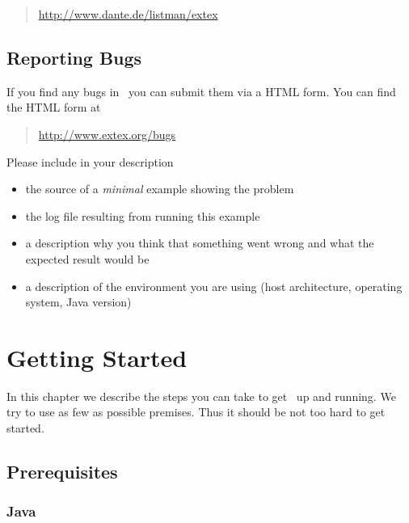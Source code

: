 \documentclass{extex-doc}
\begin{document}
\begin{quotation}
  \url{http://www.dante.de/listman/extex}
\end{quotation}


\section{Reporting Bugs}


If you find any bugs in \ExTeX\ you can submit them 
via a HTML form.
You can find the HTML form at
\begin{quotation}
  \url{http://www.extex.org/bugs}
\end{quotation}

Please include in your description 
\begin{itemize}
\item the source of a \emph{minimal} example showing the problem
\item the log file resulting from running this example
\item a description why you think that something went wrong and what
  the expected result would be
\item a description of the environment you are using (host
  architecture, operating system, Java version)
\end{itemize}


\chapter{Getting Started}

In this chapter we describe the steps you can take to get \ExTeX\ up
and running. We try to use as few as possible premises. Thus it should
be not too hard to get started.

\section{Prerequisites}

\subsection{Java}
\end{document}
